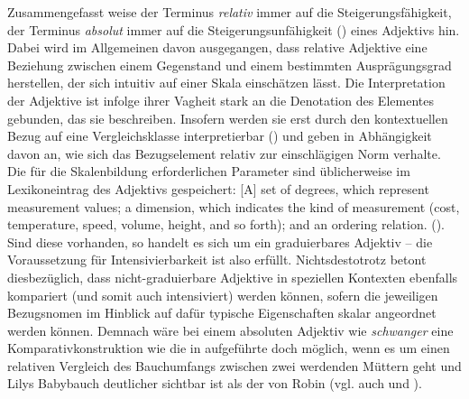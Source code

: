 \largerpage
Zusammengefasst weise \glqq{}der Terminus \textit{relativ} immer auf die Steigerungsfähigkeit, der Terminus \textit{absolut} immer auf die Steigerungsunfähigkeit\grqq{} ({\citealt[14]{Trost.2006}}) eines Adjektivs hin. Dabei wird im Allgemeinen davon ausgegangen, dass relative Adjektive eine Beziehung zwischen einem Gegenstand und einem bestimmten Ausprägungsgrad herstellen, der sich intuitiv auf einer Skala einschätzen lässt. Die Interpretation der Adjektive ist infolge ihrer Vagheit stark an die Denotation des Elementes gebunden, das sie beschreiben. Insofern werden sie \glqq{}erst durch den kontextuellen Bezug auf eine Vergleichsklasse \textelp{} interpretierbar{}\grqq{} ({\citealt[13]{Kirschbaum.2002b}}) und geben in Abhängigkeit davon an, wie sich das Bezugselement relativ zur einschlägigen Norm verhalte. Die für die Skalenbildung erforderlichen Parameter sind üblicherweise im Lexikoneintrag des Adjektivs gespeichert: \glqq{}[A] set of degrees, which represent measurement values; a dimension, which indicates the kind of measurement (cost, temperature, speed, volume, height, and so forth); and an ordering relation.\grqq{} (\citealt[351]{Kennedy.2005}). Sind diese vorhanden, so handelt es sich um ein graduierbares Adjektiv -- die Voraussetzung für Intensivierbarkeit ist also erfüllt. Nichtsdestotrotz betont {\citet[24]{Os.1989}} diesbezüglich, dass nicht-graduierbare Adjektive in speziellen Kontexten ebenfalls kompariert (und somit auch intensiviert) werden können, sofern die jeweiligen Bezugsnomen im Hinblick auf dafür typische Eigenschaften skalar angeordnet werden können. Demnach wäre bei einem absoluten Adjektiv wie \textit{schwanger} eine Komparativkonstruktion wie die in  aufgeführte doch möglich, wenn es um einen relativen Vergleich des Bauchumfangs zwischen zwei werdenden Müttern geht und Lilys Babybauch deutlicher sichtbar ist als der von Robin (vgl. auch \citealt[170]{Wright.1995} und {\citealt[151]{Pafel.2016}}).

